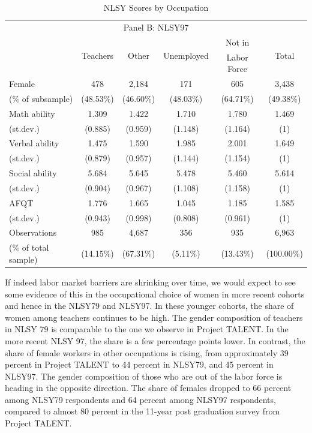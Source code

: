 \documentclass[onehalfspacing,11pt]{article}
\begin{document}
\begin{table}[h!]
\begin{tabular}{lccccc}
			\bottomrule
			\\
			\toprule
			\multicolumn{6}{c}{Panel B: NLSY97}\\
			\midrule
			& \multirow{2}{*}{Teachers} & \multirow{2}{*}{Other} & \multirow{2}{*}{Unemployed} & Not in & \multirow{2}{*}{Total}\\
			& &  &  & Labor Force & \\
			\midrule
			Female & 478 & 2,184 & 171 & 605 & 3,438\\
			\quad (\% of subsample) & (48.53\%) & (46.60\%) & (48.03\%) & (64.71\%) & (49.38\%)\\
			\midrule
			Math ability & 1.309 & 1.422 & 1.710 & 1.780 & 1.469\\
			\quad (st.dev.) & (0.885) & (0.959) & (1.148) & (1.164) & (1)\\
			\midrule
			Verbal ability & 1.475 & 1.590 & 1.985 & 2.001 &  1.649\\
			\quad (st.dev.) & (0.879) & (0.957) & (1.144) & (1.154) & (1)\\
			\midrule
			Social ability & 5.684 & 5.645 & 5.478 & 5.460 & 5.614\\
			\quad (st.dev.) & (0.904) & (0.967) & (1.108) & (1.158) & (1)\\
			\midrule
			AFQT & 1.776 & 1.665 & 1.045 & 1.185 & 1.585\\
			\quad (st.dev.) & (0.943) & (0.998) & (0.808) & (0.961) & (1)\\
			\midrule
			Observations &  985 & 4,687 &  356 & 935 & 6,963\\
			\quad (\% of total sample) & (14.15\%) & (67.31\%) & (5.11\%) & (13.43\%) & (100.00\%)\\
			\bottomrule
		\end{tabular}
		\caption{NLSY Scores by Occupation}
		\label{tab:NLSYscores}
	\end{table}
	
	If indeed labor market barriers are shrinking over time, we would expect to see some evidence of this in the occupational choice of women in more recent cohorts and hence in the NLSY79 and NLSY97. In these younger cohorts, the share of women among teachers continues to be high. The gender composition of teachers in NLSY 79 is comparable to the one we observe in Project TALENT. In the more recent NLSY 97, the share is a few percentage points lower. In contrast, the share of female workers in other occupations is rising, from approximately 39 percent in Project TALENT to 44 percent in NLSY79, and 45 percent in NLSY97. The gender composition of those who are out of the labor force is heading in the opposite direction. The share of females dropped to 66 percent among NLSY79 respondents and 64 percent among NLSY97 respondents, compared to almost 80 percent in the 11-year post graduation survey from Project TALENT.
	
\end{document}
